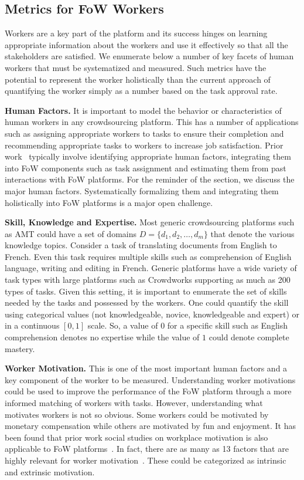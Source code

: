 \subsection{Metrics for FoW Workers}
Workers are a key part of the platform and its success hinges on learning appropriate information about the workers and use it effectively so that all the stakeholders are satisfied.
We enumerate below a number of key facets of human workers that must be systematized and measured.
Such metrics have the potential to represent the worker holistically than the current approach of quantifying the worker simply as a number based on the task approval rate.

\textbf{Human Factors.}
It is important to model the behavior or characteristics of human workers in any crowdsourcing platform.
This has a number of applications such as assigning appropriate workers to tasks to ensure their completion
and recommending appropriate tasks to workers to increase job satisfaction.
Prior work~\cite{amer2016human,roy2013crowds,cullina2015measuring}
typically involve identifying appropriate human factors,
integrating them into FoW components such as task assignment and
estimating them from past interactions with FoW platforms.
For the reminder of the section, we discuss the major human factors.
Systematically formalizing them and integrating them holistically into FoW platforms is a major open challenge.

\textbf{Skill, Knowledge and Expertise.}
Most generic crowdsourcing platforms such as AMT could have a set of domains
$D=\{d_1, d_2, \ldots, d_m\}$ that denote the various knowledge topics.
Consider a task of translating documents from English to French.
Even this task requires multiple skills such as comprehension of English language,
writing and editing in French.
Generic platforms have a wide variety of task types with large platforms such as Crowdworks
supporting as much as 200 types of tasks.
Given this setting, it is important to enumerate the set of skills needed by the tasks
and possessed by the workers.
One could quantify the skill using categorical values (not knowledgeable, novice, knowledgeable and expert)
or in a continuous $[0, 1]$ scale.
So, a value of $0$ for a specific skill such as English comprehension denotes no expertise
while the value of $1$ could denote complete mastery.

\textbf{Worker Motivation.}
This is one of the most important human factors and a key component of the worker to be measured.
Understanding worker motivations could be used to improve the performance of the FoW platform
through a more informed matching of workers with tasks.
However, understanding what motivates workers is not so obvious.
Some workers could be motivated by monetary compensation while others are motivated by fun and enjoyment.
It has been found that prior work social studies on
workplace motivation is also applicable to FoW platforms~\cite{kaufmann2011more,pilz2013does}.
In fact, there are as many as 13 factors that are highly relevant for worker motivation~\cite{kaufmann2011more}.
These could be categorized as intrinsic and extrinsic motivation.

